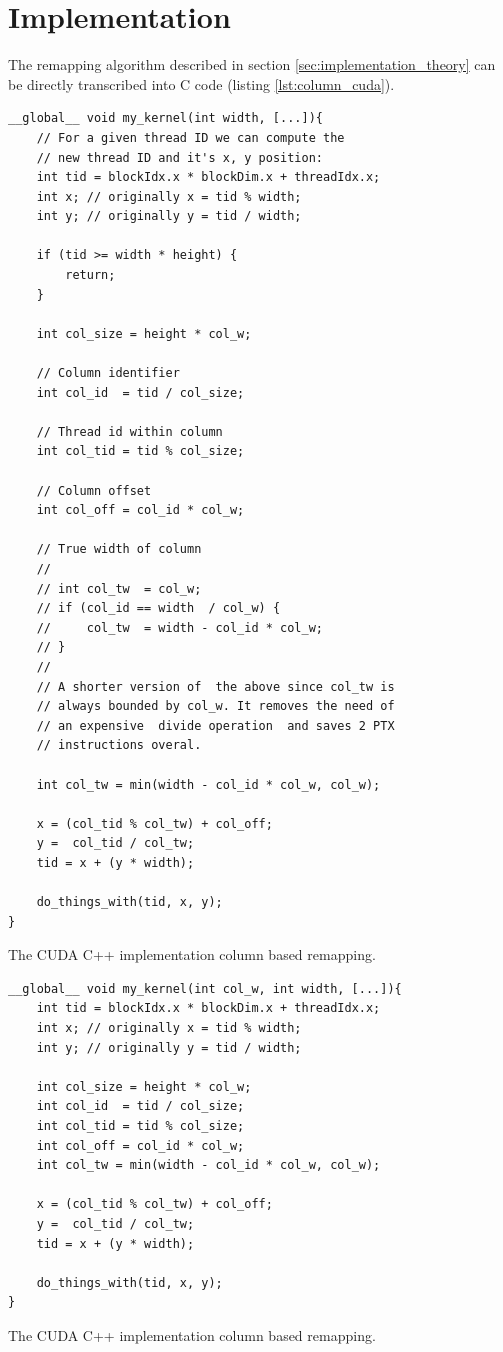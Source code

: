 \section{Implementation}

The remapping algorithm described in section \ref{sec:implementation_theory} can be directly transcribed into C code (listing \ref{lst:column_cuda}).
\begin{listing}[ht]
    \begin{verbatim}
__global__ void my_kernel(int width, [...]){
    // For a given thread ID we can compute the 
    // new thread ID and it's x, y position:
    int tid = blockIdx.x * blockDim.x + threadIdx.x;
    int x; // originally x = tid % width;
    int y; // originally y = tid / width;

    if (tid >= width * height) {
        return;
    }

    int col_size = height * col_w;

    // Column identifier
    int col_id  = tid / col_size;

    // Thread id within column
    int col_tid = tid % col_size;

    // Column offset
    int col_off = col_id * col_w;

    // True width of column
    //
    // int col_tw  = col_w;
    // if (col_id == width  / col_w) {
    //     col_tw  = width - col_id * col_w;
    // }
    //
    // A shorter version of  the above since col_tw is 
    // always bounded by col_w. It removes the need of 
    // an expensive  divide operation  and saves 2 PTX
    // instructions overal. 
    
    int col_tw = min(width - col_id * col_w, col_w);

    x = (col_tid % col_tw) + col_off;
    y =  col_tid / col_tw;
    tid = x + (y * width);

    do_things_with(tid, x, y);
}
    \end{verbatim}
    \caption{
        The CUDA C++ implementation column based remapping.
    }
    \label{lst:column_cuda}
\end{listing}


\begin{listing}[ht]
    \begin{verbatim}
__global__ void my_kernel(int col_w, int width, [...]){
    int tid = blockIdx.x * blockDim.x + threadIdx.x;
    int x; // originally x = tid % width;
    int y; // originally y = tid / width;

    int col_size = height * col_w;
    int col_id  = tid / col_size;
    int col_tid = tid % col_size;
    int col_off = col_id * col_w;
    int col_tw = min(width - col_id * col_w, col_w);

    x = (col_tid % col_tw) + col_off;
    y =  col_tid / col_tw;
    tid = x + (y * width);

    do_things_with(tid, x, y);
}
    \end{verbatim}
    \caption{
        The CUDA C++ implementation column based remapping.
    }
    \label{lst:column_cuda2}
\end{listing}

